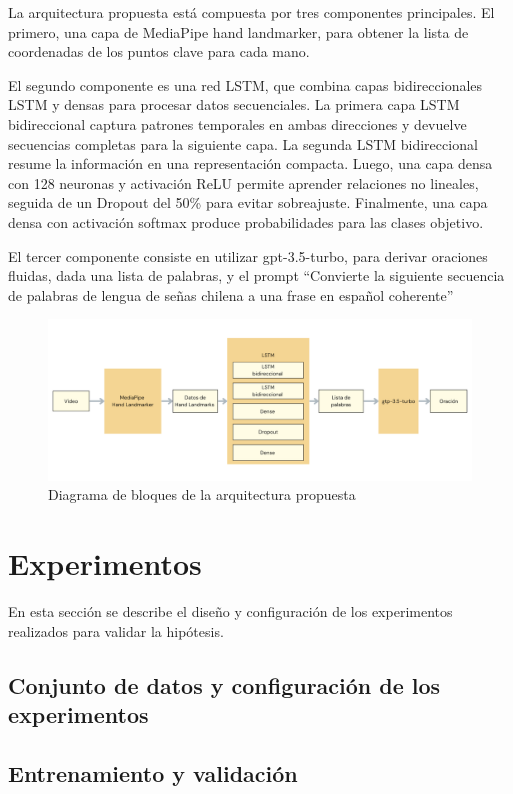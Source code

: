 \documentclass{article}
\begin{document}
La arquitectura propuesta está compuesta por tres componentes principales. El primero, una capa de MediaPipe hand landmarker, para obtener la lista de coordenadas de los puntos clave para cada mano.

El segundo componente es una red LSTM, que combina capas bidireccionales LSTM y densas para procesar datos secuenciales. La primera capa LSTM bidireccional captura patrones temporales en ambas direcciones y devuelve secuencias completas para la siguiente capa. La segunda LSTM bidireccional resume la información en una representación compacta. Luego, una capa densa con 128 neuronas y activación ReLU permite aprender relaciones no lineales, seguida de un Dropout del 50\% para evitar sobreajuste. Finalmente, una capa densa con activación softmax produce probabilidades para las clases objetivo.

El tercer componente consiste en utilizar gpt-3.5-turbo, para derivar oraciones fluidas, dada una lista de palabras, y el prompt “Convierte la siguiente secuencia de palabras de lengua de señas chilena a una frase en español coherente”

\begin{figure}[!hbtp]
    \centering
    \includegraphics[width=5in]{figuras/architecture-diagram.png}
		\caption{Diagrama de bloques de la arquitectura propuesta}
		\label{fig7}
\end{figure}

\section{Experimentos}

En esta sección se describe el diseño y configuración de los experimentos realizados para validar la hipótesis.

\subsection{ Conjunto de datos y configuración de los experimentos }
\subsection{ Entrenamiento y validación }
\end{document}
